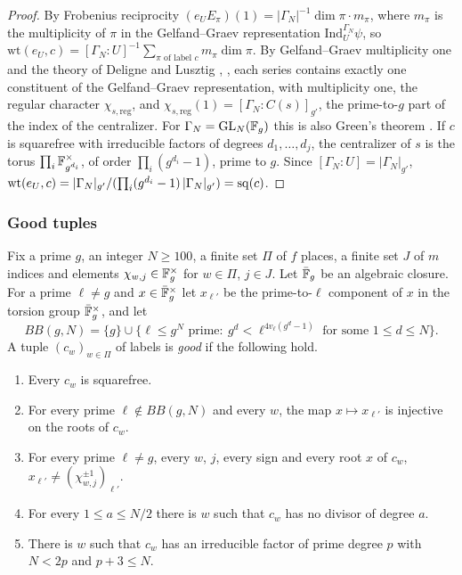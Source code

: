 \begin{proof}
By Frobenius reciprocity $(e_UE_\pi)(1)=|\Gamma_N|^{-1}\dim\pi\cdot m_\pi$, where $m_\pi$ is the multiplicity of $\pi$ in the Gelfand--Graev representation $\mathrm{Ind}_U^{\Gamma_N}\psi$, so $\mathrm{wt}(e_U,c)=[\Gamma_N:U]^{-1}\sum_{\pi\text{ of label }c}m_\pi\dim\pi$. By Gelfand--Graev multiplicity one and the theory of Deligne and Lusztig \cite[\S10]{w2dl}, \cite[Ch.~8]{w2carter}, each series contains exactly one constituent of the Gelfand--Graev representation, with multiplicity one, the regular character $\chi_{s,\mathrm{reg}}$, and $\chi_{s,\mathrm{reg}}(1)=[\Gamma_N:C(s)]_{g'}$, the prime-to-$g$ part of the index of the centralizer. For $\Gamma_N=\mathrm{GL}_N(\mathbb F_g)$ this is also Green's theorem \cite{w2green}. If $c$ is squarefree with irreducible factors of degrees $d_1,\dots,d_j$, the centralizer of $s$ is the torus $\prod_i\mathbb F_{g^{d_i}}^\times$, of order $\prod_i(g^{d_i}-1)$, prime to $g$. Since $[\Gamma_N:U]=|\Gamma_N|_{g'}$, $\mathrm{wt}(e_U,c)=|\Gamma_N|_{g'}/(\prod_i(g^{d_i}-1)\,|\Gamma_N|_{g'})=\mathrm{sq}(c)$.
\end{proof}

\subsubsection{Good tuples}

Fix a prime $g$, an integer $N\ge100$, a finite set $\Pi$ of $f$ places, a finite set $J$ of $m$ indices and elements $\chi_{w,j}\in\mathbb F_g^\times$ for $w\in\Pi$, $j\in J$. Let $\bar{\mathbb F}_g$ be an algebraic closure. For a prime $\ell\ne g$ and $x\in\bar{\mathbb F}_g^\times$ let $x_{\ell'}$ be the prime-to-$\ell$ component of $x$ in the torsion group $\bar{\mathbb F}_g^\times$, and let
\[
BB(g,N)=\{g\}\cup\bigl\{\ell\le g^N\text{ prime}:\ g^d<\ell^{4v_\ell(g^d-1)}\text{ for some }1\le d\le N\bigr\}.
\]
A tuple $(c_w)_{w\in\Pi}$ of labels is \emph{good} if the following hold.
\begin{enumerate}[label=(G\arabic*),leftmargin=*]
\item\label{w2:G1} Every $c_w$ is squarefree.
\item\label{w2:G2} For every prime $\ell\notin BB(g,N)$ and every $w$, the map $x\mapsto x_{\ell'}$ is injective on the roots of $c_w$.
\item\label{w2:G3} For every prime $\ell\ne g$, every $w$, $j$, every sign and every root $x$ of $c_w$, $x_{\ell'}\ne(\chi_{w,j}^{\pm1})_{\ell'}$.
\item\label{w2:G4} For every $1\le a\le N/2$ there is $w$ such that $c_w$ has no divisor of degree $a$.
\item\label{w2:G5} There is $w$ such that $c_w$ has an irreducible factor of prime degree $p$ with $N<2p$ and $p+3\le N$.
\end{enumerate}


